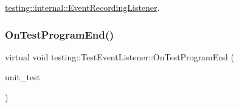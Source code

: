 \mbox{\hyperlink{classtesting_1_1internal_1_1_event_recording_listener_a21fe9c3c519c4599a48b16ddfb734aa3}{testing\+::internal\+::\+Event\+Recording\+Listener}}.

\mbox{\label{classtesting_1_1_test_event_listener_ad15b6246d94c268e233487a86463ef3d}} 
\subsubsection{\texorpdfstring{OnTestProgramEnd()}{OnTestProgramEnd()}\hspace{0.1cm}{\footnotesize\ttfamily [2/3]}}
{\footnotesize\ttfamily virtual void testing\+::\+Test\+Event\+Listener\+::\+On\+Test\+Program\+End (\begin{DoxyParamCaption}\item[{const \mbox{\hyperlink{classtesting_1_1_unit_test}{Unit\+Test}} \&}]{unit\+\_\+test }\end{DoxyParamCaption})\hspace{0.3cm}{\ttfamily [pure virtual]}}



